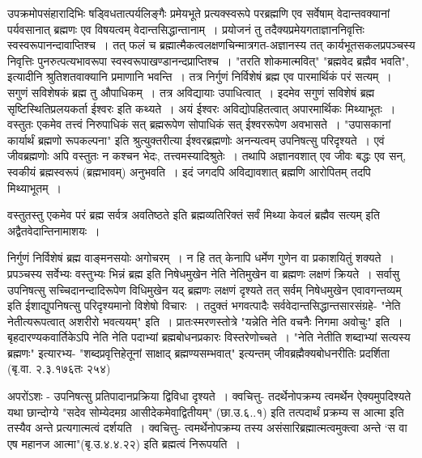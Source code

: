 {उपक्रमोपसंहारादिभिः षड्विधतात्पर्यलिङ्गैः प्रमेयभूते प्रत्यक्स्वरूपे परब्रह्मणि एव सर्वेषाम् वेदान्तवक्यानां पर्यवसानात् ब्रह्मणः एव विषयत्वम् वेदान्तसिद्धान्तानाम्~। प्रयोजनं तु तदैक्यप्रमेयगताज्ञाननिवृत्तिः स्वस्वरूपानन्दावाप्तिश्च~। तत् फलं च ब्रह्मात्मैकत्वलक्षण\-चिन्मात्रगत-अज्ञानस्य तत् कार्यभूतसकलप्रपञ्चस्य निवृत्तिः पुनरुत्पत्यभावरूपा स्वस्वरूपाखण्डानन्दप्राप्तिश्च~। "तरति शोकमात्मवित्" "ब्रह्मवेद ब्रह्मैव भवति", इत्यादीनि श्रुतिशतवाक्यानि प्रमाणानि भवन्ति~। तत्र निर्गुणं निर्विशेषं ब्रह्म एव पारमार्थिकं परं सत्यम्~। सगुणं सविशेषकं ब्रह्म तु औपाधिकम्~। तत्र अविद्यायाः उपाधित्वात्~। इदमेव सगुणं सविशेषं ब्रह्म सृष्टिस्थितिप्रलयकर्ता ईश्वरः इति कथ्यते~। अयं ईश्वरः अविद्योपहितत्वात् अपारमार्थिकः मिथ्याभूतः~। वस्तुतः एकमेव तत्त्वं निरुपाधिकं सत् ब्रह्मरूपेण सोपाधिकं सत् ईश्वररूपेण अवभासते~। "उपासकानां कार्यार्थं ब्रह्मणो रूपकल्पना" इति श्रुत्युक्तरीत्या ईश्वरब्रह्मणोः अनन्यत्वम् उपनिषत्सु परिदृश्यते~। एवं जीवब्रह्मणोः अपि वस्तुतः न कश्चन भेदः, तत्त्वमस्यादिश्रुतेः~। तथापि अज्ञानवशात् एव जीवः बद्धः एव सन्, स्वकीयं ब्रह्मस्वरूपं (ब्रह्मभावम्) अनुभवति~। इदं जगदपि अविद्यावशात् ब्रह्मणि आरोपितम् तदपि मिथ्याभूतम्~। 

वस्तुतस्तु एकमेव परं ब्रह्म सर्वत्र अवतिष्ठते इति ब्रह्मव्यतिरिक्तं सर्वं मिथ्या केवलं ब्रह्मैव सत्यम् इति अद्वैतवेदान्तिनामाशयः~। 

निर्गुणं निर्विशेषं ब्रह्म वाङ्मनसयोः अगोचरम्~। न हि तत् केनापि धर्मेण गुणेन वा प्रकाशयितुं शक्यते~। प्रपञ्चस्य सर्वेभ्यः वस्तुभ्यः भिन्नं ब्रह्म इति निषेधमुखेन नेति नेतिमुखेन वा ब्रह्मणः लक्षणं क्रियते~। सर्वासु उपनिषत्सु सच्चिदानन्दादिरूपेण विधिमुखेन यद् ब्रह्मणः लक्षणं दृश्यते तत् सर्वम् निषेधमुखेन एवावगन्तव्यम् इति ईशाद्युपनिषत्सु परिदृश्यमानो विशेषो विचारः~। तदुक्तं भगवत्पादैः सर्ववेदान्तसिद्धान्तसारसंग्रहे- "नेति नेतीत्यरूपत्वात् अशरीरो भवत्ययम्" इति~। प्रातःस्मरणस्तोत्रे "यन्नेति नेति वचनैः निगमा अवोचुः" इति~। बृहदारण्यकवार्तिकेऽपि नेति नेति पदाभ्यां ब्रह्मबोधनप्रकारः विस्तरेणोच्चते~। "नेति नेतीति शब्दाभ्यां सत्यस्य ब्रह्मणः" इत्यारभ्य- "शब्दप्रवृत्तिहेतूनां साक्षाद् ब्रह्मण्यसम्भवात्" इत्यन्तम् जीवब्रह्मैक्यबोधनरीतिः प्रदर्शिता (बृ.वा. २.३.१७६तः २५४)

अपरोंऽशः - उपनिषत्सु प्रतिपादानप्रक्रिया द्विविधा दृश्यते~। क्वचित्तु- तदर्थेनोपक्रम्य त्वमर्थेन ऐक्यमुपदिश्यते यथा छान्दोग्ये "सदेव सोम्येदमग्र आसीदेकमेवाद्वितीयम्" (छा.उ.६..१) इति तत्पदार्थं प्रक्रम्य स आत्मा इति तस्यैव अन्ते प्रत्यगात्मत्वं दर्शयति~। क्वचित्तु- त्वमर्थेनोपक्रम्य तस्य असंसारिब्रह्मात्मत्वमुक्त्वा अन्ते ‘स वा एष महानज आत्मा"(बृ.उ.४.४.२२) इति ब्रह्मत्वं निरूपयति~। 

}

